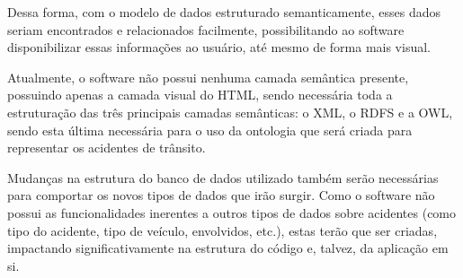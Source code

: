     Dessa forma, com o modelo de dados estruturado semanticamente, esses dados seriam
    encontrados e relacionados facilmente, possibilitando ao software disponibilizar essas
    informações ao usuário, até mesmo de forma mais visual.

    Atualmente, o software não possui nenhuma camada semântica presente, possuindo
    apenas a camada visual do HTML, sendo necessária toda a estruturação das três principais
    camadas semânticas: o XML, o RDFS e a OWL, sendo esta última necessária para o uso da
    ontologia que será criada para representar os acidentes de trânsito.

    Mudanças na estrutura do banco de dados utilizado também serão necessárias para
    comportar os novos tipos de dados que irão surgir. Como o software não possui as
    funcionalidades inerentes a outros tipos de dados sobre acidentes (como tipo do acidente, tipo
    de veículo, envolvidos, etc.), estas terão que ser criadas, impactando significativamente na
    estrutura do código e, talvez, da aplicação em si.
    
    